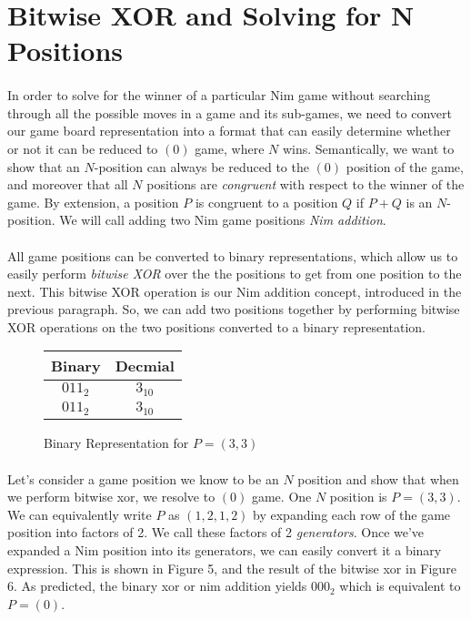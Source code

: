 \documentclass{article}
\begin{document}
\section*{Bitwise XOR and Solving for N Positions}

\paragraph{}
In order to solve for the winner of a particular Nim game without searching through all the possible moves in a game and its sub-games, we need to convert our game board representation into a format that can easily determine whether or not it can be reduced to $(0)$ game, where $N$ wins. Semantically, we want to show that an $N$-position can always be reduced to the $(0)$ position of the game, and moreover that all $N$ positions are \textit{congruent} with respect to the winner of the game. By extension, a position $P$ is congruent to a position $Q$ if $P + Q$ is an $N$-position. We will call adding two Nim game positions \textit{Nim addition}.

\paragraph{}
All game positions can be converted to binary representations, which allow us to easily perform \textit{bitwise XOR} over the the positions to get from one position to the next. This bitwise XOR operation is our Nim addition concept, introduced in the previous paragraph. So, we can add two positions together by performing bitwise XOR operations on the two positions converted to a binary representation.

\begin{figure}[h]
\centering
\begin{tabular}{|c|c|}
\hline
Binary & Decmial\\
\hline
$011_{2}$ & $3_{10}$\\
$011_{2}$ & $3_{10}$\\
\hline
\end{tabular}
\caption{Binary Representation for $P = (3,3)$}
\end{figure}
\pagebreak
\paragraph{}
Let's consider a game position we know to be an $N$ position and show that when we perform bitwise xor, we resolve to $(0)$ game. One $N$ position is $P = (3,3)$. We can equivalently write $P$ as $(1, 2, 1, 2)$ by expanding each row of the game position into factors of 2. We call these factors of 2 \textit{generators}. Once we've expanded a Nim position into its generators, we can easily convert it a binary expression. This is shown in Figure 5, and the result of the bitwise xor in Figure 6. As predicted, the binary xor or nim addition yields $000_{2}$ which is equivalent to $P = (0)$.
\end{document}
